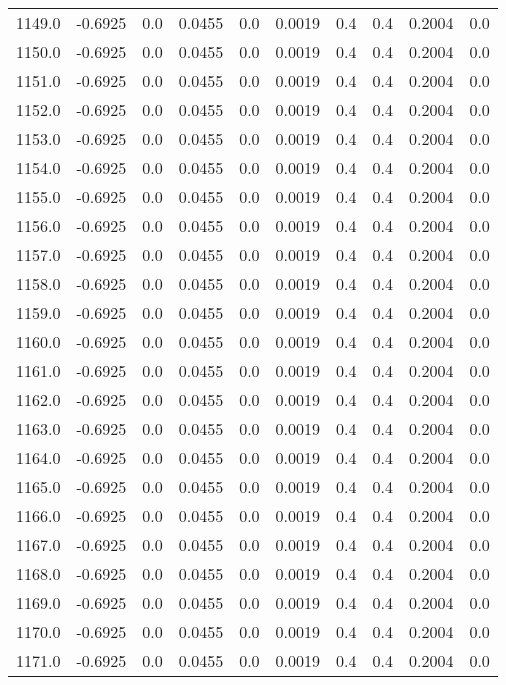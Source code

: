 \begin{longtable}{lrrrrrrrrr}
1149.0 & -0.6925 & 0.0 & 0.0455 & 0.0 & 0.0019 & 0.4 & 0.4 & 0.2004 & 0.0 \\
1150.0 & -0.6925 & 0.0 & 0.0455 & 0.0 & 0.0019 & 0.4 & 0.4 & 0.2004 & 0.0 \\
1151.0 & -0.6925 & 0.0 & 0.0455 & 0.0 & 0.0019 & 0.4 & 0.4 & 0.2004 & 0.0 \\
1152.0 & -0.6925 & 0.0 & 0.0455 & 0.0 & 0.0019 & 0.4 & 0.4 & 0.2004 & 0.0 \\
1153.0 & -0.6925 & 0.0 & 0.0455 & 0.0 & 0.0019 & 0.4 & 0.4 & 0.2004 & 0.0 \\
1154.0 & -0.6925 & 0.0 & 0.0455 & 0.0 & 0.0019 & 0.4 & 0.4 & 0.2004 & 0.0 \\
1155.0 & -0.6925 & 0.0 & 0.0455 & 0.0 & 0.0019 & 0.4 & 0.4 & 0.2004 & 0.0 \\
1156.0 & -0.6925 & 0.0 & 0.0455 & 0.0 & 0.0019 & 0.4 & 0.4 & 0.2004 & 0.0 \\
1157.0 & -0.6925 & 0.0 & 0.0455 & 0.0 & 0.0019 & 0.4 & 0.4 & 0.2004 & 0.0 \\
1158.0 & -0.6925 & 0.0 & 0.0455 & 0.0 & 0.0019 & 0.4 & 0.4 & 0.2004 & 0.0 \\
1159.0 & -0.6925 & 0.0 & 0.0455 & 0.0 & 0.0019 & 0.4 & 0.4 & 0.2004 & 0.0 \\
1160.0 & -0.6925 & 0.0 & 0.0455 & 0.0 & 0.0019 & 0.4 & 0.4 & 0.2004 & 0.0 \\
1161.0 & -0.6925 & 0.0 & 0.0455 & 0.0 & 0.0019 & 0.4 & 0.4 & 0.2004 & 0.0 \\
1162.0 & -0.6925 & 0.0 & 0.0455 & 0.0 & 0.0019 & 0.4 & 0.4 & 0.2004 & 0.0 \\
1163.0 & -0.6925 & 0.0 & 0.0455 & 0.0 & 0.0019 & 0.4 & 0.4 & 0.2004 & 0.0 \\
1164.0 & -0.6925 & 0.0 & 0.0455 & 0.0 & 0.0019 & 0.4 & 0.4 & 0.2004 & 0.0 \\
1165.0 & -0.6925 & 0.0 & 0.0455 & 0.0 & 0.0019 & 0.4 & 0.4 & 0.2004 & 0.0 \\
1166.0 & -0.6925 & 0.0 & 0.0455 & 0.0 & 0.0019 & 0.4 & 0.4 & 0.2004 & 0.0 \\
1167.0 & -0.6925 & 0.0 & 0.0455 & 0.0 & 0.0019 & 0.4 & 0.4 & 0.2004 & 0.0 \\
1168.0 & -0.6925 & 0.0 & 0.0455 & 0.0 & 0.0019 & 0.4 & 0.4 & 0.2004 & 0.0 \\
1169.0 & -0.6925 & 0.0 & 0.0455 & 0.0 & 0.0019 & 0.4 & 0.4 & 0.2004 & 0.0 \\
1170.0 & -0.6925 & 0.0 & 0.0455 & 0.0 & 0.0019 & 0.4 & 0.4 & 0.2004 & 0.0 \\
1171.0 & -0.6925 & 0.0 & 0.0455 & 0.0 & 0.0019 & 0.4 & 0.4 & 0.2004 & 0.0 \\

\end{longtable}
